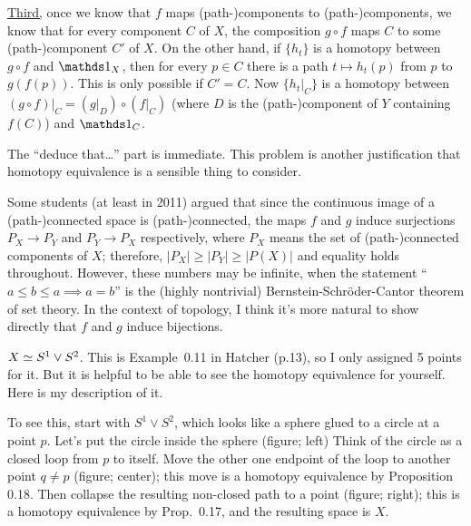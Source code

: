 \underline{Third,} once we know that $f$ maps (path-)components to (path-)components, we know that for every component $C$ of $X$, the composition $g\circ f$ maps $C$ to some (path-)component $C'$ of $X$.  On the other hand, if $\{h_t\}$ is a homotopy between $g\circ f$ and $\IdMap_X$, then for every $p\in C$ there is a path $t\mapsto h_t(p)$ from $p$ to $g(f(p))$.  This is only possible if $C'=C$.  Now $\{h_t|_C\}$ is a homotopy between $(g\circ f)|_C = (g|_D)\circ(f|_C)$ (where $D$ is the (path-)component of $Y$ containing $f(C)$) and $\IdMap_C$.
 
The ``deduce that\dots'' part is immediate.  This problem is another
justification that homotopy equivalence is a sensible thing
to consider.

Some students (at least in 2011) argued that since the continuous image of a (path-)connected
space is (path-)connected, the maps $f$ and $g$ induce surjections $P_X\to P_Y$
and $P_Y\to P_X$ respectively, where $P_X$ means the set of (path-)connected components
of $X$; therefore, $|P_X|\geq|P_Y|\geq|P(X)|$ and equality holds throughout.  However,
these numbers may be infinite, when the statement ``$a\leq b\leq a\implies a=b$'' is
the (highly nontrivial) Bernstein-Schr\"oder-Cantor theorem of set theory.  In the
context of topology, I think it's more natural to show directly that $f$ and $g$ induce
bijections.



\soln $X\simeq S^1\vee S^2$.  This is Example~0.11 in Hatcher (p.13),
so I only assigned 5 points for it.  But it is helpful to be able to
see the homotopy equivalence for yourself.  Here is my description of it.

To see this, start with $S^1\vee S^2$, which looks like a sphere glued to a circle
at a point $p$.  Let's put the circle inside the sphere (figure; left)
Think of the circle as a closed loop from $p$ to itself.
Move the other one endpoint of the loop to another point $q\neq p$ (figure; center);
this move is a homotopy equivalence by
Proposition 0.18.  Then collapse the resulting non-closed path to a point (figure; right);
this is a homotopy equivalence by Prop.~0.17, and the resulting space is $X$.


